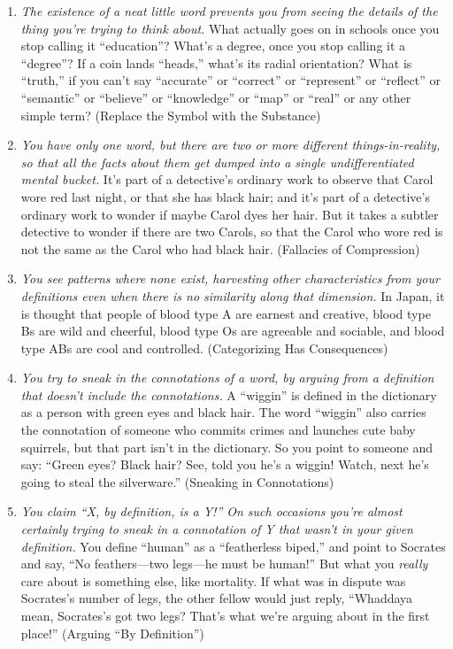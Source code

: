{{\begin{enumerate}
\item {
 \textit{The existence of a neat little word prevents you from
seeing the details of the thing you're trying to think
about.} What actually goes on in schools once you stop calling it
``education''?
What's a degree, once you stop calling it a
``degree''? If a coin lands
``heads,'' what's
its radial orientation? What is
``truth,'' if you
can't say
``accurate'' or
``correct'' or
``represent'' or
``reflect'' or
``semantic'' or
``believe'' or
``knowledge'' or
``map'' or
``real'' or any other simple term?
(Replace the Symbol with the Substance)}

\item {
 \textit{You have only one word, but there are two or more
different things-in-reality, so that all the facts about them get
dumped into a single undifferentiated mental bucket.}
It's part of a detective's ordinary
work to observe that Carol wore red last night, or that she has black
hair; and it's part of a detective's
ordinary work to wonder if maybe Carol dyes her hair. But it takes a
subtler detective to wonder if there are two Carols, so that the Carol
who wore red is not the same as the Carol who had black hair.
(Fallacies of Compression)}

\item {
 \textit{You see patterns where none exist, harvesting other
characteristics from your }\textit{definitions even when there is no
similarity along that dimension.} In Japan, it is thought that people
of blood type A are earnest and creative, blood type Bs are wild and
cheerful, blood type Os are agreeable and sociable, and blood type ABs
are cool and controlled. (Categorizing Has Consequences)}

\item {
 \textit{You try to sneak in the connotations of a word, by arguing
from a definition that doesn't include the
connotations.} A ``wiggin'' is
defined in the dictionary as a person with green eyes and black hair.
The word ``wiggin'' also carries the
connotation of someone who commits crimes and launches cute baby
squirrels, but that part isn't in the dictionary. So
you point to someone and say: ``Green eyes? Black
hair? See, told you he's a wiggin! Watch, next
he's going to steal the silverware.''
(Sneaking in Connotations)}

\item {
 \textit{You claim ``X, by definition, is a
Y!'' On such occasions you're almost
certainly trying to sneak in a connotation of Y that
wasn't in your given definition.} You define
``human'' as a
``featherless biped,'' and point to
Socrates and say, ``No feathers---two legs---he must
be human!'' But what you \textit{really} care about
is something else, like mortality. If what was in dispute was
Socrates's number of legs, the other fellow would just
reply, ``Whaddaya mean, Socrates's got
two legs? That's what we're arguing
about in the first place!'' (Arguing
``By Definition'')}


\end{enumerate}}}

